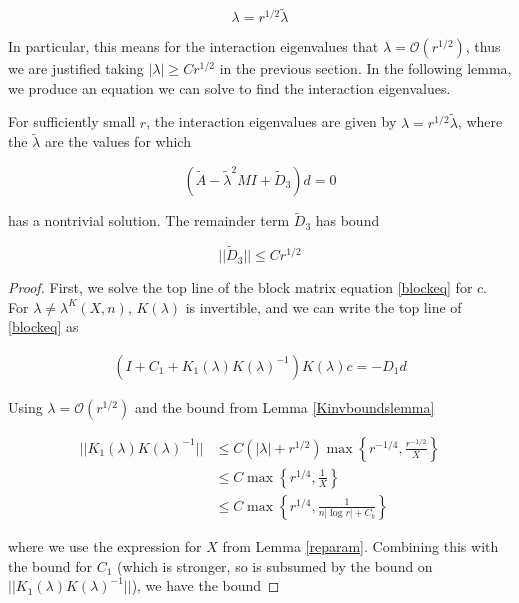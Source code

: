 \documentclass[thesis.tex]{subfiles}
\begin{document}
\[
\lambda = r^{1/2}\tilde{\lambda}
\]

In particular, this means for the interaction eigenvalues that $\lambda = \mathcal{O}(r^{1/2})$, thus we are justified taking $|\lambda| \geq C r^{1/2}$ in the previous section. In the following lemma, we produce an equation we can solve to find the interaction eigenvalues.


\begin{lemma}\label{deqlemma}
For sufficiently small $r$, the interaction eigenvalues are given by $\lambda = r^{1/2} \tilde{\lambda}$, where the $\tilde{\lambda}$ are the values for which

\begin{equation}\label{eqford}
(\tilde{A} - \tilde{\lambda}^2 MI + \tilde{D}_3)d = 0
\end{equation}

has a nontrivial solution. The remainder term $\tilde{D}_3$ has bound

\begin{equation}\label{tildeD3bound}
||\tilde{D}_3|| \leq C r^{1/2}
\end{equation}

\begin{proof}
First, we solve the top line of the block matrix equation \eqref{blockeq} for $c$. For $\lambda \neq \lambda^K(X, n)$, $K(\lambda)$ is invertible, and we can write the top line of \eqref{blockeq} as

\begin{align*}
(I + C_1 + K_1(\lambda)K(\lambda)^{-1}) K(\lambda) c = -D_1 d
\end{align*}

Using $\lambda = \mathcal{O}(r^{1/2})$ and the bound from Lemma \ref{Kinvboundslemma}

\begin{align*}
||K_1(\lambda)K(\lambda)^{-1}|| &\leq C (|\lambda| + r^{1/2})\max \left\{ r^{-1/4}, \frac{r^{-1/2}}{X} \right\} \\
&\leq C \max \left\{ r^{1/4}, \frac{1}{X} \right\} \\
&\leq C \max \left\{ r^{1/4}, \frac{1}{n |\log r| + C_b } \right\}
\end{align*}

where we use the expression for $X$ from Lemma \ref{reparam}. Combining this with the bound for $C_1$ (which is stronger, so is subsumed by the bound on $||K_1(\lambda)K(\lambda)^{-1}||$), we have the bound


\end{proof}
\end{lemma}
\end{document}
